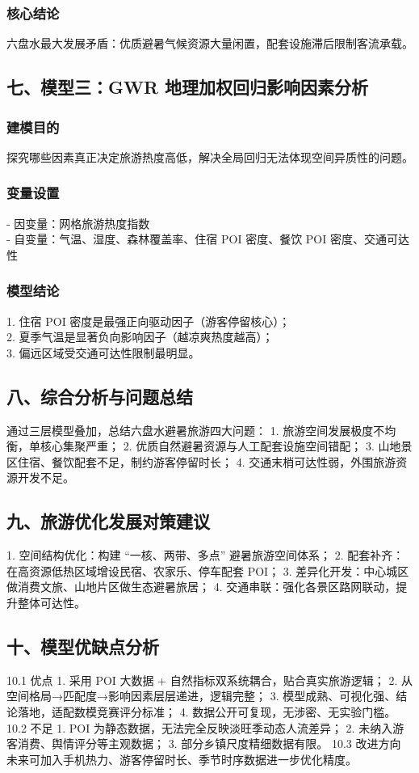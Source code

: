 \subsubsection*{核心结论}
六盘水最大发展矛盾：优质避暑气候资源大量闲置，配套设施滞后限制客流承载。

\subsection*{七、模型三：GWR 地理加权回归影响因素分析}
\subsubsection*{建模目的}
探究哪些因素真正决定旅游热度高低，解决全局回归无法体现空间异质性的问题。
\subsubsection*{变量设置}
- 因变量：网格旅游热度指数 \\
- 自变量：气温、湿度、森林覆盖率、住宿 POI 密度、餐饮 POI 密度、交通可达性 \\
\subsubsection*{模型结论}
1. 住宿 POI 密度是最强正向驱动因子（游客停留核心）； \\
2. 夏季气温是显著负向影响因子（越凉爽热度越高）；  \\
3. 偏远区域受交通可达性限制最明显。 \\

\subsection*{八、综合分析与问题总结}
通过三层模型叠加，总结六盘水避暑旅游四大问题：
1. 旅游空间发展极度不均衡，单核心集聚严重；
2. 优质自然避暑资源与人工配套设施空间错配；
3. 山地景区住宿、餐饮配套不足，制约游客停留时长；
4. 交通末梢可达性弱，外围旅游资源开发不足。

\subsection*{九、旅游优化发展对策建议}
1. 空间结构优化：构建 “一核、两带、多点” 避暑旅游空间体系；
2. 配套补齐：在高资源低热区域增设民宿、农家乐、停车配套 POI；
3. 差异化开发：中心城区做消费文旅、山地片区做生态避暑旅居；
4. 交通串联：强化各景区路网联动，提升整体可达性。

\subsection*{十、模型优缺点分析}
10.1 优点
1. 采用 POI 大数据 + 自然指标双系统耦合，贴合真实旅游逻辑；
2. 从空间格局→匹配度→影响因素层层递进，逻辑完整；
3. 模型成熟、可视化强、结论落地，适配数模竞赛评分标准；
4. 数据公开可复现，无涉密、无实验门槛。
10.2 不足
1. POI 为静态数据，无法完全反映淡旺季动态人流差异；
2. 未纳入游客消费、舆情评分等主观数据；
3. 部分乡镇尺度精细数据有限。
10.3 改进方向
未来可加入手机热力、游客停留时长、季节时序数据进一步优化精度。

